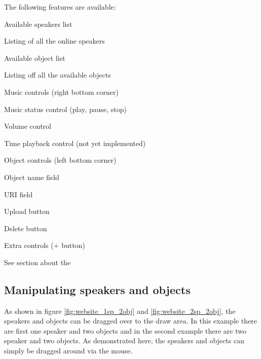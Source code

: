 The following features are available:
\begin{shortlist}
    \item Available speakers list
    \begin{shortlist}
        \item Listing of all the online speakers
    \end{shortlist}
    \item Available object list
    \begin{shortlist}
        \item Listing off all the available objects
    \end{shortlist}
    \item Music controls (right bottom corner)
    \begin{shortlist}
        \item Music status control (play, pause, stop)
        \item Volume control
        \item Time playback control (not yet implemented)
    \end{shortlist}
    \item Object controls (left bottom corner)
    \begin{shortlist}
        \item Object name field
        \item URI field
        \item Upload button
        \item Delete button
    \end{shortlist}
    \item Extra controls (+ button)
    \begin{shortlist}
        \item See section about the 
    \end{shortlist}
\end{shortlist}

\subsection{Manipulating speakers and objects}
\label{sub:manipulating_speakers_and_objects}
As shown in figure \ref{fig:website_1sp_2obj} and \ref{fig:website_2sp_2obj}, the speakers and objects can be dragged over to the draw area.
In this example there are first one speaker and two objects and in the second example there are two speaker and two objects.
As demonstrated here, the speakers and objects can simply be dragged around via the mouse.

